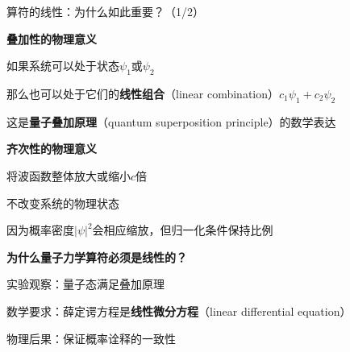 
\begin{frame}{算符的线性：为什么如此重要？（1/2）}
  
  
    \begin{iqbitemize}
      \item \textbf{叠加性的物理意义}
      \begin{iqbitemize}
        \item 如果系统可以处于状态$\psi_1$或$\psi_2$
        \item 那么也可以处于它们的\textbf{线性组合}（linear combination）$c_1\psi_1 + c_2\psi_2$
        \item 这是\textbf{量子叠加原理}（quantum superposition principle）的数学表达
      \end{iqbitemize}

      \item \textbf{齐次性的物理意义}
      \begin{iqbitemize}
        \item 将波函数整体放大或缩小$c$倍
        \item 不改变系统的物理状态
        \item 因为概率密度$|\psi|^2$会相应缩放，但归一化条件保持比例
      \end{iqbitemize}

      \item \textbf{为什么量子力学算符必须是线性的？}
      \begin{iqbitemize}
        \item 实验观察：量子态满足叠加原理
        \item 数学要求：薛定谔方程是\textbf{线性微分方程}（linear differential equation）
        \item 物理后果：保证概率诠释的一致性
      \end{iqbitemize}
    \end{iqbitemize}
  
\end{frame}


